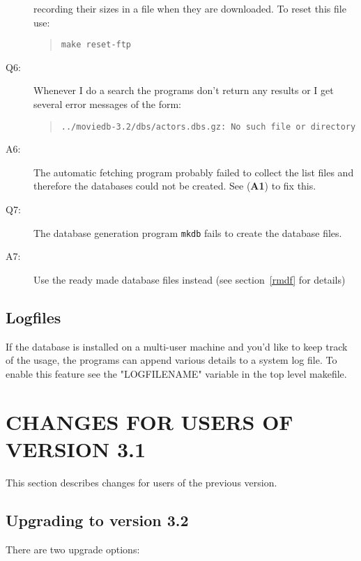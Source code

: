 \begin{description}
recording their
sizes in a file when they are downloaded. To reset this file use:
\begin{quote}
{\tt make reset-ftp}
\end{quote}
\item[Q6:] Whenever I do a search the programs don't return any results or 
I get
several error messages of the form:
\begin{quote}
{\tt ../moviedb-3.2/dbs/actors.dbs.gz: No such file or directory}
\end{quote}
\item[A6:] The automatic fetching program probably failed to collect the 
list
files and therefore the databases could not be created. See ({\bf A1}) to
fix this.
\item[Q7:] The database generation program {\tt mkdb} fails to create the 
database files.
\item[A7:] Use the ready made database files instead (see 
section~\ref{rmdf} 
for details)
\end{description}

\subsection{Logfiles}

If the database is installed on a multi-user machine and you'd like to keep
track of the usage, the programs can append various details to a system
log file. To enable this feature see the "LOGFILENAME" variable in the top
level makefile.
\clearpage
\section{\label{update}CHANGES FOR USERS OF VERSION 3.1}

This section describes changes for users of the previous version.

\subsection{Upgrading to version 3.2}

There are two upgrade options:

